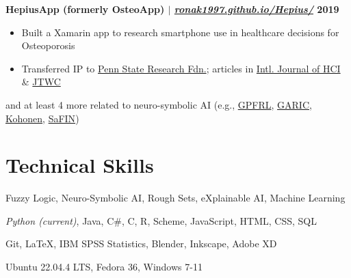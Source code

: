 \documentclass[11pt]{article} %
\begin{document}
\noindent\textbf{HepiusApp (formerly OsteoApp) $|$ \href{https://ronak1997.github.io/Hepius/}{\normalfont\textit{ronak1997.github.io/Hepius/}} \hfill 2019}
\vspace{-6pt}
\begin{itemize}
\setlength\itemsep{-0.5em}
  \item Built a Xamarin app to research smartphone use in healthcare decisions for Osteoporosis
  \item Transferred IP to \href{https://ott.psu.edu/penn-state-research-foundation/}{Penn State Research Fdn.}; articles in \href{https://pure.psu.edu/en/publications/development-and-patient-user-experience-evaluation-of-an-mhealth-}{Intl. Journal of HCI} \& \href{https://pure.psu.edu/en/publications/mhealth-apps-for-older-adults-a-method-for-development-and-user-e}{JTWC} %
\end{itemize}
\vspace{-4pt}
\noindent
and at least 4 more related to neuro-symbolic AI (e.g., \href{https://github.com/johnHostetter/GPFRL}{GPFRL}, \href{https://github.com/johnHostetter/GARIC}{GARIC}, \href{https://github.com/johnHostetter/Kohonen}{Kohonen}, \href{https://github.com/johnHostetter/Neuro-Fuzzy-Networks}{SaFIN})

\vspace{-12pt}

\section{Technical Skills}
\vspace{-8pt}
\begin{description}[itemsep=0pt]
\setlength\itemsep{-0.5em}
    \item[Interests:] Fuzzy Logic, Neuro-Symbolic AI, Rough Sets, eXplainable AI, Machine Learning
    \item[Languages:] \textit{Python (current)}, Java, C\#, C, R, Scheme, JavaScript, HTML, CSS, SQL
	\item[Software:] Git, \LaTeX, IBM SPSS Statistics, Blender, Inkscape, Adobe XD
    \item[Operating Systems:] Ubuntu 22.04.4 LTS, Fedora 36, Windows 7-11
\end{description}
\end{document}

